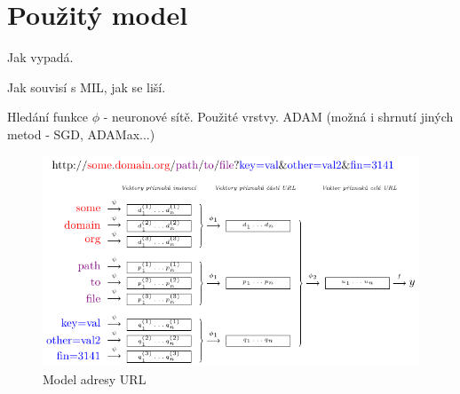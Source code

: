 \chapter{Použitý model}\label{model}

Jak vypadá.

Jak souvisí s MIL, jak se liší.

Hledání funkce \( \phi \) - neuronové sítě. Použité vrstvy. ADAM (možná i shrnutí jiných metod - SGD, ADAMax...)

\begin{figure}
	\caption{Model adresy URL}\label{url_model}
	\centering
	\includegraphics{images/model/model.pdf}
\end{figure}


